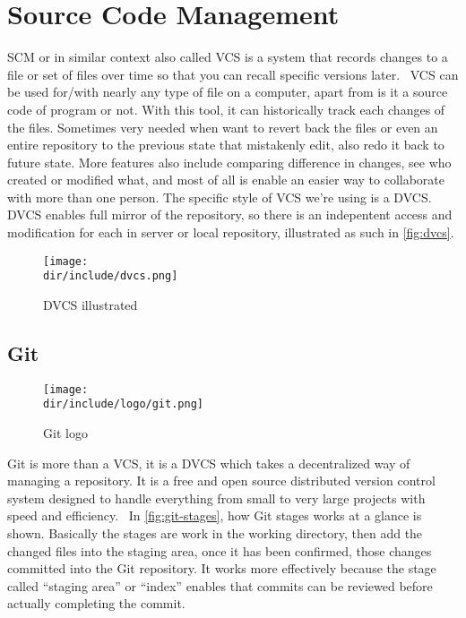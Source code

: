 \section{Source Code Management}
\label{sec:scm}

\ac{SCM} or in similar context also called \ac{VCS} is a system that records changes to a file or set of files over time so that you can recall specific versions later.~\autocite{Chacon:2014:ProGit:27}
\ac{VCS} can be used for/with nearly any type of file on a computer, apart from is it a source code of program or not.
With this tool, it can historically track each changes of the files.
Sometimes very needed when want to revert back the files or even an entire repository to the previous state that mistakenly edit, also redo it back to future state.
More features also include comparing difference in changes, see who created or modified what, and most of all is enable an easier way to collaborate with more than one person.
The specific style of \ac{VCS} we're using is a \ac{DVCS}.
\ac{DVCS} enables full mirror of the repository, so there is an indepentent access and modification for each in server or local repository, illustrated as such in \autoref{fig:dvcs}.

\begin{figure}[htb]
    \centering
    \texttt{[image: \\dir/include/dvcs.png]}
    \caption[DVCS illustrated]{DVCS illustrated}
    \label{fig:dvcs}
\end{figure}

\clearpage

\subsection{Git}

\begin{wrapfigure}{r}{0.5\textwidth}
  \vspace{-20pt}
  \begin{center}
    \texttt{[image: \\dir/include/logo/git.png]}
  \end{center}
  \vspace{-20pt}
  \caption{Git logo}
  \label{fig:git-logo}
  \vspace{-10pt}
\end{wrapfigure}

Git is more than a \ac{VCS}, it is a \ac{DVCS} which takes a decentralized way of managing a repository.
It is a free and open source distributed version control system designed to handle everything from small to very large projects with speed and efficiency.~\autocite{Git2010}
In \autoref{fig:git-stages}, how Git stages works at a glance is shown.
Basically the stages are work in the working directory, then add the changed files into the staging area, once it has been confirmed, those changes committed into the Git repository.
It works more effectively because the stage called ``staging area'' or ``index'' enables that commits can be reviewed before actually completing the commit.

